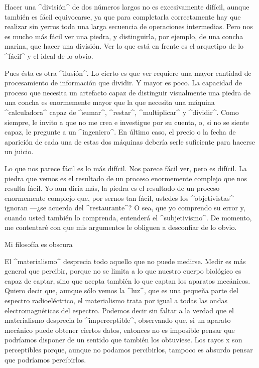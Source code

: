 Hacer una ^división^ de dos números largos no es excesivamente difícil,
aunque también es fácil equivocarse, ya que para completarla
correctamente hay que realizar sin yerros toda una larga secuencia de
operaciones intermedias. Pero nos es mucho más fácil ver una piedra, y
distinguirla, por ejemplo, de una concha marina, que hacer una división.
Ver lo que está en frente es el arquetipo de lo ^fácil^ y el ideal de lo
obvio.

Pues ésta es otra ^ilusión^. Lo cierto es que ver requiere una mayor
cantidad de procesamiento de información que dividir. Y mayor es poco.
La capacidad de proceso que necesita un artefacto capaz de distinguir
visualmente una piedra de una concha es enormemente mayor que la que
necesita una máquina ^calculadora^ capaz de ^sumar^, ^restar^,
^multiplicar^ y ^dividir^. Como siempre, le invito a que no me crea e
investigue por su cuenta, o, si no se siente capaz, le pregunte a un
^ingeniero^. En último caso, el precio o la fecha de aparición de cada
una de estas dos máquinas debería serle suficiente para hacerse un
juicio.

Lo que nos parece fácil es lo más difícil. Nos parece fácil ver, pero es
difícil. La piedra que vemos es el resultado de un proceso enormemente
complejo que nos resulta fácil. Yo aun diría más, la piedra es el
resultado de un proceso enormemente complejo que, por sernos tan fácil,
ustedes los ^objetivistas^ ignoran ---¿se acuerda del ^restaurante^? O
sea, que yo comprendo su error y, cuando usted también lo comprenda,
entenderá el ^subjetivismo^. De momento, me contentaré con que mis
argumentos le obliguen a desconfiar de lo obvio.


\Section Mi filosofía es obscura

El ^materialismo^ desprecia todo aquello que no puede medirse. Medir es
más general que percibir, porque no se limita a lo que nuestro cuerpo
biológico es capaz de captar, sino que acepta también lo que captan los
aparatos mecánicos. Quiero decir que, aunque sólo vemos la ^luz^, que es
una pequeña parte del espectro radioeléctrico, el materialismo trata por
igual a todas las ondas electromagnéticas del espectro. Podemos decir
sin faltar a la verdad que el materialismo desprecia lo ^imperceptible^,
observando que, si un aparato mecánico puede obtener ciertos datos,
entonces no es imposible pensar que podríamos disponer de un sentido que
también los obtuviese. Los rayos {\sc x} son perceptibles porque, aunque
no podamos percibirlos, tampoco es absurdo pensar que podríamos
percibirlos.


